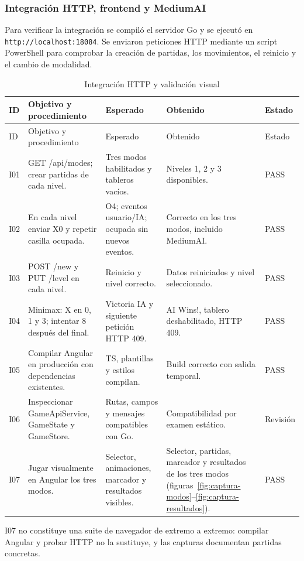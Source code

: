 \documentclass[12pt,a4paper]{article}
\begin{document}
\subsubsection{Integración HTTP, frontend y MediumAI}
Para verificar la integración se compiló el servidor Go y se ejecutó en
\texttt{http://localhost:18084}. Se enviaron peticiones HTTP mediante un script
PowerShell para comprobar la creación de partidas, los movimientos, el reinicio
y el cambio de modalidad.
\begin{longtable}{p{1cm}p{3.4cm}p{3.3cm}p{3.4cm}p{1.6cm}}
\caption{Integración HTTP y validación visual}\\
\toprule ID & Objetivo y procedimiento & Esperado & Obtenido & Estado\\\midrule\endfirsthead
\toprule ID & Objetivo y procedimiento & Esperado & Obtenido & Estado\\\midrule\endhead
I01 & GET /api/modes; crear partidas de cada nivel. & Tres modos habilitados y tableros vacíos. & Niveles 1, 2 y 3 disponibles. & PASS\\
I02 & En cada nivel enviar X0 y repetir casilla ocupada. & O4; eventos usuario/IA; ocupada sin nuevos eventos. & Correcto en los tres modos, incluido MediumAI. & PASS\\
I03 & POST /new y PUT /level en cada nivel. & Reinicio y nivel correcto. & Datos reiniciados y nivel seleccionado. & PASS\\
I04 & Minimax: X en 0, 1 y 3; intentar 8 después del final. & Victoria IA y siguiente petición HTTP 409. & AI Wins!, tablero deshabilitado, HTTP 409. & PASS\\
I05 & Compilar Angular en producción con dependencias existentes. & TS, plantillas y estilos compilan. & Build correcto con salida temporal. & PASS\\
I06 & Inspeccionar GameApiService, GameState y GameStore. & Rutas, campos y mensajes compatibles con Go. & Compatibilidad por examen estático. & Revisión\\
I07 & Jugar visualmente en Angular los tres modos. & Selector, animaciones, marcador y resultados visibles. & Selector, partidas, marcador y resultados de los tres modos (figuras~\ref{fig:captura-modos}--\ref{fig:captura-resultados}). & PASS\\
\bottomrule
\end{longtable}
I07 no constituye una suite de navegador de extremo a extremo: compilar Angular y probar
HTTP no la sustituye, y las capturas documentan partidas concretas.
\end{document}
